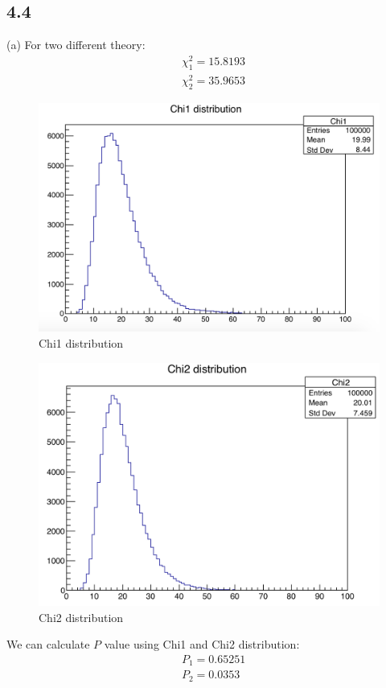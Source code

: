 \documentclass{article}
\begin{document}
\begin{CJK*}{GBK}{song}
\section{4.4}
(a)
For two different theory:
\begin{equation}
\begin{aligned}
&\chi^2_1=15.8193\\
&\chi^2_2=35.9653
\end{aligned}
\end{equation}
\begin{figure}[H]
\centerline{\includegraphics[scale=0.4]{4.4b1.png}}
\caption{Chi1 distribution}
\label{fig:label}
\end{figure}
\begin{figure}[H]
\centerline{\includegraphics[scale=0.4]{4.4b2.png}}
\caption{Chi2 distribution}
\label{fig:label}
\end{figure}
We can calculate $P$ value using Chi1 and Chi2 distribution:
\begin{equation}
\begin{aligned}
&P_1=0.65251\\
&P_2=0.0353
\end{aligned}
\end{equation}


\end{CJK*}
\end{document}
